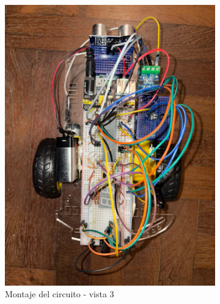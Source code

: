 \documentclass[]{article}
\begin{document}
\begin{figure}[h!]
		\begin{subfigure}[b]{0.45\textwidth}
			\centering
			\includegraphics[width=\linewidth]{Figuras/montaje_3}
			\caption{Montaje del circuito - vista 3}
			\label{fig:montaje3}
		\end{subfigure}
		\hfill
		\begin{subfigure}[b]{0.45\textwidth}
			\centering

\end{subfigure}
\end{figure}
\end{document}
